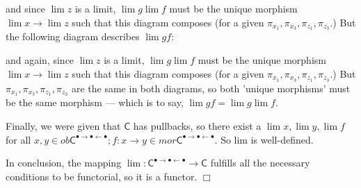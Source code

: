 \documentclass[../../main]{subfiles}
\begin{document}
	\noindent and since $ \lim z $ is a limit, $ \lim g \lim f $ must be the unique morphism $ \lim x \to \lim z $ such that this diagram composes (for a given $ \pi_{x_1}, \pi_{x_3}, \pi_{z_1}, \pi_{z_3}. $) But the following diagram describes $ \lim gf: $
	
	\begin{center}\end{center}

	\noindent and again, since $ \lim z $ is a limit, $ \lim g \lim f $ must be the unique morphism $ \lim x \to \lim z $ such that this diagram composes (for a given $ \pi_{x_1}, \pi_{x_3}, \pi_{z_1}, \pi_{z_3}. $) But $ \pi_{x_1}, \pi_{x_3}, \pi_{z_1}, \pi_{z_3} $ are the same in both diagrams, so both 'unique morphisms' must be the same morphism --- which is to say, $\lim gf = \lim g \lim f. $
	
	
	Finally, we were given that $ \mathsf{C} $ has pullbacks, so there exist a $ \lim x, \lim y, \lim f $ for all $ x, y \in ob \mathsf{C}^{\bullet\rightarrow\bullet\leftarrow\bullet}; f: x \to y \in mor \mathsf{C}^{\bullet\rightarrow\bullet\leftarrow\bullet}. $ So lim is well-defined. 
	
	In conclusion, the mapping $ \lim: \mathsf{C}^{\bullet\rightarrow\bullet\leftarrow\bullet} \to \mathsf{C} $ fulfills all the necessary conditions to be functorial, so it is a functor. $ \Box $



	
	
		
\end{document}

